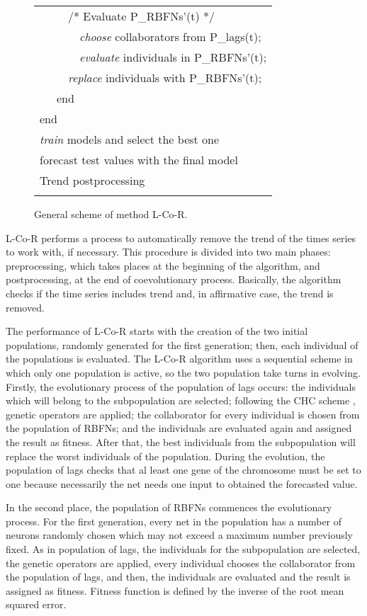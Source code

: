 \documentclass[a4paper,twoside]{article}
\newcommand{\metodo}{L-Co-R}
\begin{document}
\begin{figure}
\begin{tabular}{|l|}
\ \ \ \ \ /* Evaluate P\_RBFNs'(t) */  \\
\ \ \ \ \ \ \ \emph{choose} collaborators from P\_lags(t); \\
\ \ \ \ \ \ \ \emph{evaluate} individuals in P\_RBFNs'(t); \\
\ \ \ \ \ \emph{replace} individuals with P\_RBFNs'(t);  \\
\ \ \ end  \\
end  \\
\emph{train} models and select the best one \\
forecast test values with the final model \\
Trend postprocessing \\
\\
\hline
\end{tabular}
\caption{General scheme of method {\metodo}.}
\label{generalscheme}
\end{figure}

{\metodo} performs a process to automatically remove the trend of the times series to work with, if necessary. This procedure is divided into two main phases: preprocessing, which takes places at the beginning of the algorithm, and postprocessing, at the end of coevolutionary process. Basically, the algorithm checks if the time series includes trend and, in affirmative case, the trend is removed.

The performance of {\metodo} starts with the creation of the two initial populations, randomly generated for the first generation; then, each individual of the populations is evaluated. The {\metodo} algorithm uses a sequential scheme in which only one population is active, so the two population take turns in evolving. Firstly, the evolutionary process of the population of lags occurs: the individuals which will belong to the subpopulation are selected; following the CHC scheme \cite{Eshelman}, genetic operators are applied; the collaborator for every individual is chosen from the population of RBFNs; and the individuals are evaluated again and assigned the result as fitness. After that, the best individuals from the subpopulation will replace the worst individuals of the population. During the evolution, the population of lags checks that al least one gene of the chromosome must be set to one because necessarily the net needs one input to obtained the forecasted value.

In the second place, the population of RBFNs commences the evolutionary process. For the first generation, every net in the population has a number of neurons randomly chosen which may not exceed a maximum number previously fixed. As in population of lags, the individuals for the subpopulation are selected, the genetic operators are applied, every individual chooses the collaborator from the population of lags, and then, the individuals are evaluated and the result is assigned as fitness. Fitness function is defined by the inverse of the root mean squared error.%
\end{document}
